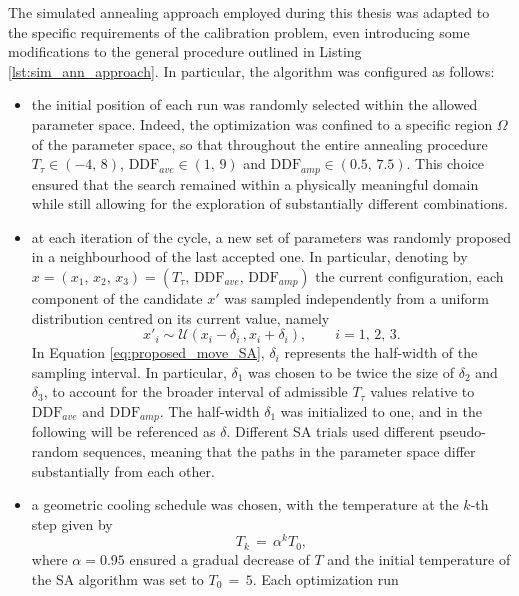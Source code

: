 The simulated annealing approach employed during this thesis was adapted to the specific requirements of the calibration problem, even introducing some 
modifications to the general procedure outlined in Listing \ref{lst:sim_ann_approach}. In particular, the algorithm was configured as follows: 
\begin{itemize}[label=$\blacktriangleright$]
    \item the initial position of each run was randomly selected within the allowed parameter space. Indeed, the optimization was confined to a specific 
    region $\Omega$ of the parameter space, so that throughout the entire annealing procedure $T_\tau \in \left(-4,\,8\right)$, $\text{DDF}_{ave} \in \left(1,\,9\right)$ 
    and $\text{DDF}_{amp} \in \left(0.5,\,7.5\right)$. This choice ensured that the search remained within a physically meaningful domain while still 
    allowing for the exploration of substantially different combinations.
    \item at each iteration of the cycle, a new set of parameters was randomly proposed in a neighbourhood of the last accepted one. In particular, 
    denoting by $x = \left(x_1,\, x_2,\, x_3\right) = \left(T_\tau,\, \text{DDF}_{ave},\, \text{DDF}_{amp}\right)$ the current configuration, each 
    component of the candidate $x'$ was sampled independently from a uniform distribution centred on its current value, namely 
    \begin{equation}
        x'_i \sim \mathcal{U}\left(x_i - \delta_i\,, x_i + \delta_i\right), \qquad i = 1,\,2,\,3.
        \label{eq:proposed_move_SA}
    \end{equation}
    In Equation \ref{eq:proposed_move_SA}, $\delta_i$ represents the half-width of the sampling interval.  In particular, $\delta_1$ was chosen to be 
    twice the size of $\delta_2$ and $\delta_3$, to account for the broader interval of admissible $T_\tau$ values relative to $\text{DDF}_{ave}$ and $\text{DDF}_{amp}$. 
    The half-width $\delta_1$ was initialized to one, and in the following will be referenced as $\delta$. Different SA trials used different 
    pseudo-random sequences, meaning that the paths in the parameter space differ substantially from each other.
    \item a geometric cooling schedule was chosen, with the temperature at the $k$-th step given by 
    \begin{equation}
        T_k\,=\,\alpha^k T_0,
        \label{eq:cooling_schedule_SA}
    \end{equation}
    where $\alpha = 0.95$ ensured a gradual decrease of $T$ and the initial temperature of the SA algorithm was set to $T_0\,=\,5$. Each optimization run 

\end{itemize}
